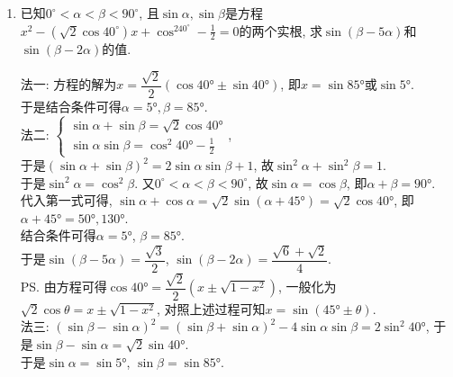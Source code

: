 \begin{enumerate}
\item 已知$0^\circ<\alpha<\beta<90^\circ$, 且$\sin\alpha,\sin\beta$是方程$x^2-\left(\sqrt2\cos40^\circ\right)x+\cos^240^{\circ}-\frac{1}{2}=0$的两个实根, 
求$\sin\left(\beta-5\alpha\right)$和$\sin\left(\beta-2\alpha\right)$的值. 
\begin{jieda}
法一: 方程的解为$x=\dfrac{\sqrt{2}}{2}\left(\cos\ang{40}\pm\sin\ang{40}\right)$, 即$x=\sin\ang{85}$或$\sin\ang{5}$. \\
于是结合条件可得$\alpha=\ang{5},\beta=\ang{85}$. \\
法二: $\begin{cases}
\sin\alpha+\sin\beta=\sqrt{2}\cos\ang{40}\\
\sin\alpha\sin\beta=\cos^2\ang{40}-\frac{1}{2}
\end{cases}$, \\
于是$\left(\sin\alpha+\sin\beta\right)^2=2\sin\alpha\sin\beta+1$, 故$\sin^2\alpha+\sin^2\beta=1$. \\
于是$\sin^2\alpha=\cos^2\beta$. 又$0^\circ<\alpha<\beta<90^\circ$, 故$\sin\alpha=\cos\beta$, 即$\alpha+\beta=\ang{90}$. \\
代入第一式可得, $\sin\alpha+\cos\alpha=\sqrt{2}\sin\left(\alpha+\ang{45}\right)=\sqrt{2}\cos\ang{40}$, 即$\alpha+\ang{45}=\ang{50},\ang{130}$. \\
结合条件可得$\alpha=\ang{5}$, $\beta=\ang{85}$. \\
于是$\sin\left(\beta-5\alpha\right)=\dfrac{\sqrt{3}}{2}$, $\sin\left(\beta-2\alpha\right)=\dfrac{\sqrt{6}+\sqrt{2}}{4}$. \\
\ps 由方程可得$\cos\ang{40}=\dfrac{\sqrt{2}}{2}\left(x\pm\sqrt{1-x^2}\right)$, 一般化为$\sqrt{2}\cos\theta=x\pm\sqrt{1-x^2}$, 对照上述过程可知$x=\sin\left(\ang{45}\pm\theta\right)$. \\
法三: $\left(\sin\beta-\sin\alpha\right)^2=\left(\sin\beta+\sin\alpha\right)^2-4\sin\alpha\sin\beta=2\sin^2\ang{40}$, 于是$\sin\beta-\sin\alpha=\sqrt{2}\sin\ang{40}$. \\
于是$\sin\alpha=\sin\ang{5}$, $\sin\beta=\sin\ang{85}$. 
\end{jieda}


\end{enumerate}
